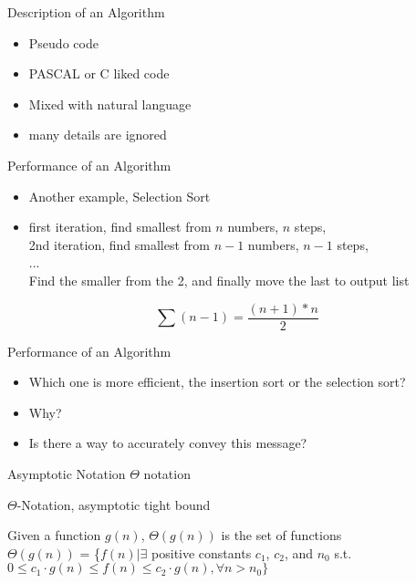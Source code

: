 \documentclass{beamer}
\begin{document}
\begin{frame}{}
\begin{center}
Description of an Algorithm
\end{center}
\begin{itemize}
\item Pseudo code
\item PASCAL or C liked code
\item Mixed with natural language
\item many details are ignored
\end{itemize}
\end{frame}

\begin{frame}{}
\begin{center}
Performance of an Algorithm
\end{center}
\begin{itemize}
\item Another example, Selection Sort
\item { first iteration, find smallest from $n$ numbers, $n$ steps,\\}
{\small 2nd iteration, find smallest from $n-1$ numbers, $n-1$ steps,\\}
{ ... \\}
{ Find the smaller from the 2, and finally move the last to output list}
\end{itemize}
$$\sum(n-1)=\frac{(n+1)*n}{2}$$
\end{frame}

\begin{frame}{}
\begin{center}
Performance of an Algorithm
\end{center}
\begin{itemize}
\item Which one is more efficient, the insertion sort or the selection sort?
\item Why?
\item Is there a way to accurately convey this message? 
\end{itemize}
\end{frame}

\begin{frame}{}
\begin{center}
{\large Asymptotic Notation $\Theta$ notation}

{$\Theta$-Notation, asymptotic tight bound}
\end{center}
Given a function $g(n)$, $\Theta(g(n))$ is the set of functions \\
$\Theta(g(n))$ = \{$f(n)| \exists$ positive constants $c_1$, $c_2$,
 and $n_0$ s.t. $0\le c_1\cdot g(n)\le f(n)\le c_2\cdot g(n), \forall n>n_0\}$
\end{frame}
\end{document}
